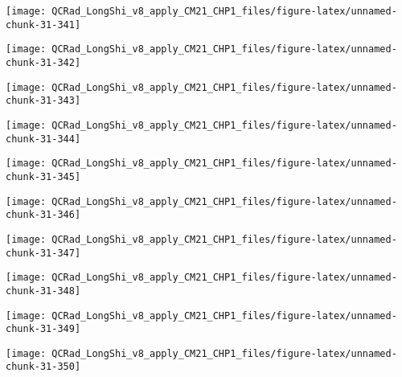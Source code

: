 \documentclass[
  10pt,
  a4paper,oneside]{article}
\begin{document}
\begin{center}\texttt{[image: QCRad\_LongShi\_v8\_apply\_CM21\_CHP1\_files/figure-latex/unnamed-chunk-31-341]} \end{center}

\begin{center}\texttt{[image: QCRad\_LongShi\_v8\_apply\_CM21\_CHP1\_files/figure-latex/unnamed-chunk-31-342]} \end{center}

\begin{center}\texttt{[image: QCRad\_LongShi\_v8\_apply\_CM21\_CHP1\_files/figure-latex/unnamed-chunk-31-343]} \end{center}

\begin{center}\texttt{[image: QCRad\_LongShi\_v8\_apply\_CM21\_CHP1\_files/figure-latex/unnamed-chunk-31-344]} \end{center}

\begin{center}\texttt{[image: QCRad\_LongShi\_v8\_apply\_CM21\_CHP1\_files/figure-latex/unnamed-chunk-31-345]} \end{center}

\begin{center}\texttt{[image: QCRad\_LongShi\_v8\_apply\_CM21\_CHP1\_files/figure-latex/unnamed-chunk-31-346]} \end{center}

\begin{center}\texttt{[image: QCRad\_LongShi\_v8\_apply\_CM21\_CHP1\_files/figure-latex/unnamed-chunk-31-347]} \end{center}

\begin{center}\texttt{[image: QCRad\_LongShi\_v8\_apply\_CM21\_CHP1\_files/figure-latex/unnamed-chunk-31-348]} \end{center}

\begin{center}\texttt{[image: QCRad\_LongShi\_v8\_apply\_CM21\_CHP1\_files/figure-latex/unnamed-chunk-31-349]} \end{center}

\begin{center}\texttt{[image: QCRad\_LongShi\_v8\_apply\_CM21\_CHP1\_files/figure-latex/unnamed-chunk-31-350]} \end{center}
\end{document}
